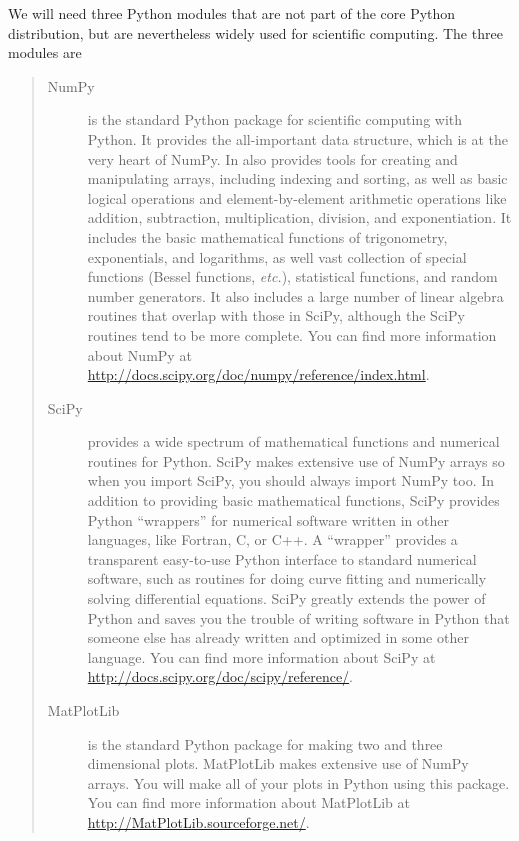 \documentclass[letterpaper,10pt,english]{sphinxmanual}
\begin{document}
We will need three Python modules that are not part of the core Python distribution, but are nevertheless widely used for scientific computing.  The three modules are
\begin{quote}
\begin{description}
\item[{NumPy}] \leavevmode
is the standard Python package for scientific computing with Python.  It provides the all-important  data structure, which is at the very heart of NumPy.  In also provides tools for creating and manipulating arrays, including indexing and sorting, as well as basic logical operations and element-by-element arithmetic operations like addition, subtraction, multiplication, division, and exponentiation.  It includes the basic mathematical functions of trigonometry, exponentials, and logarithms, as well vast collection of special functions (Bessel functions, \emph{etc.}), statistical functions, and random number generators.  It also includes a large number of linear algebra routines that overlap with those in SciPy, although the SciPy routines tend to be more complete.  You can find more information about NumPy at \href{http://docs.scipy.org/doc/numpy/reference/index.html}{http://docs.scipy.org/doc/numpy/reference/index.html}.

\item[{SciPy}] \leavevmode
provides a wide spectrum of mathematical functions and numerical routines for Python.  SciPy makes extensive use of NumPy arrays so when you import SciPy, you should always import NumPy too.  In addition to providing basic mathematical functions, SciPy provides Python ``wrappers'' for numerical software written in other languages, like Fortran, C, or C++.  A  ``wrapper'' provides a transparent easy-to-use Python interface to standard numerical software, such as routines for doing curve fitting and numerically solving differential equations.  SciPy greatly extends the power of Python and saves you the trouble of writing software in Python that someone else has already written and optimized in some other language.  You can find more information about SciPy at \href{http://docs.scipy.org/doc/scipy/reference/}{http://docs.scipy.org/doc/scipy/reference/}.

\item[{MatPlotLib}] \leavevmode
is the standard Python package for making two and three dimensional plots.  MatPlotLib makes extensive use of NumPy arrays.  You will make all of your plots in Python using this package.  You can find more information about MatPlotLib at \href{http://MatPlotLib.sourceforge.net/}{http://MatPlotLib.sourceforge.net/}.

\end{description}
\end{quote}
\end{document}
